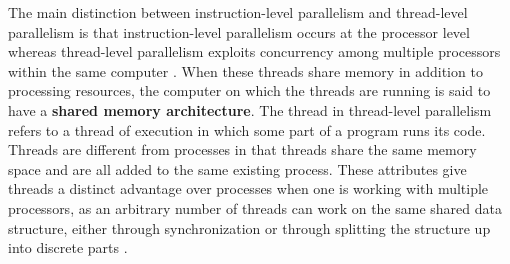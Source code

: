 The main distinction between instruction-level parallelism and thread-level parallelism is that instruction-level parallelism occurs at the processor level whereas thread-level parallelism exploits concurrency among multiple processors within the same computer \cite{hpc_openstax}. When these threads share memory in addition to processing resources, the computer on which the threads are running is said to have a \textbf{shared memory architecture}. The thread in thread-level parallelism refers to a thread of execution in which some part of a program runs its code. Threads are different from processes in that threads share the same memory space and are all added to the same existing process. These attributes give threads a distinct advantage over processes when one is working with multiple processors, as an arbitrary number of threads can work on the same shared data structure, either through synchronization or through splitting the structure up into discrete parts \cite{hpc_openstax}. 


